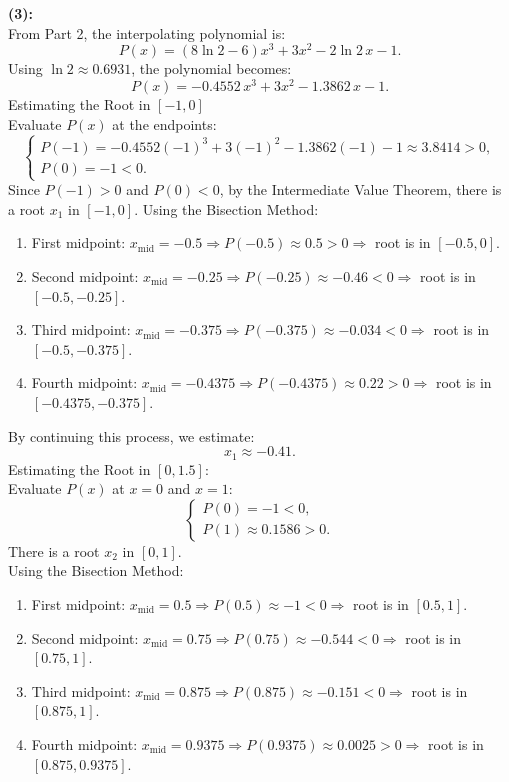 \documentclass{article}
\begin{document}
\textbf{(3): }
\\
From Part 2, the interpolating polynomial is:
\[
P(x) = (8 \ln 2 - 6) x^3 + 3 x^2 - 2 \ln 2 \, x - 1.
\]
Using \( \ln 2 \approx 0.6931 \), the polynomial becomes:
\[
P(x) = -0.4552\, x^3 + 3 x^2 - 1.3862\, x - 1.
\]
Estimating the Root in \([-1, 0]\)
\\
Evaluate \( P(x) \) at the endpoints:
\[
\begin{cases}
P(-1) = -0.4552(-1)^3 + 3(-1)^2 - 1.3862(-1) - 1 \approx 3.8414 > 0, \\
P(0) = -1 < 0.
\end{cases}
\]
Since \( P(-1) > 0 \) and \( P(0) < 0 \), by the Intermediate Value Theorem, there is a root \( x_1 \) in \([-1, 0]\).
Using the Bisection Method:
\begin{enumerate}
    \item First midpoint: \( x_{\text{mid}} = -0.5 \Rightarrow P(-0.5) \approx 0.5 > 0 \Rightarrow \) root is in \([-0.5, 0]\).
    \item Second midpoint: \( x_{\text{mid}} = -0.25 \Rightarrow P(-0.25) \approx -0.46 < 0 \Rightarrow \) root is in \([-0.5, -0.25]\).
    \item Third midpoint: \( x_{\text{mid}} = -0.375 \Rightarrow P(-0.375) \approx -0.034 < 0 \Rightarrow \) root is in \([-0.5, -0.375]\).
    \item Fourth midpoint: \( x_{\text{mid}} = -0.4375 \Rightarrow P(-0.4375) \approx 0.22 > 0 \Rightarrow \) root is in \([-0.4375, -0.375]\).
\end{enumerate}
By continuing this process, we estimate:
\[
    x_1 \approx -0.41.
\]
Estimating the Root in \([0, 1.5]\):
\\
Evaluate \( P(x) \) at \( x = 0 \) and \( x = 1 \):
\[
\begin{cases}
P(0) = -1 < 0, \\
P(1) \approx 0.1586 > 0.
\end{cases}
\]
There is a root \( x_2 \) in \([0, 1]\).
\\
Using the Bisection Method:
\begin{enumerate}
    \item First midpoint: \( x_{\text{mid}} = 0.5 \Rightarrow P(0.5) \approx -1 < 0 \Rightarrow \) root is in \([0.5, 1]\).
    \item Second midpoint: \( x_{\text{mid}} = 0.75 \Rightarrow P(0.75) \approx -0.544 < 0 \Rightarrow \) root is in \([0.75, 1]\).
    \item Third midpoint: \( x_{\text{mid}} = 0.875 \Rightarrow P(0.875) \approx -0.151 < 0 \Rightarrow \) root is in \([0.875, 1]\).
    \item Fourth midpoint: \( x_{\text{mid}} = 0.9375 \Rightarrow P(0.9375) \approx 0.0025 > 0 \Rightarrow \) root is in \([0.875, 0.9375]\).
\end{enumerate}
\end{document}
